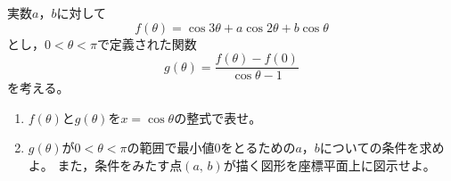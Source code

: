 \documentclass[../../main.tex]{subfiles}
\begin{document}
実数$a$，$b$に対して
\[ f(\theta)=\cos3\theta+a\cos2\theta+b\cos\theta \]
とし，$0<\theta<\pi$で定義された関数
\[ g(\theta)=\frac{f(\theta)-f(0)}{\cos\theta-1} \]
を考える。
\begin{enumerate}
  \item$f(\theta)$と$g(\theta)$を$x=\cos\theta$の整式で表せ。
  \item$g(\theta)$が$0<\theta<\pi$の範囲で最小値0をとるための$a$，$b$についての条件を求めよ。
    また，条件をみたす点$(a, \, b)$が描く図形を座標平面上に図示せよ。
\end{enumerate}
\end{document}
